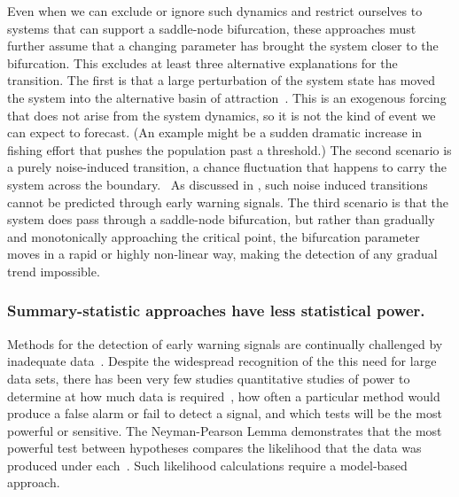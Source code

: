 \documentclass[authoryear,review,11pt]{elsarticle}
\begin{document}
Even when we can exclude or ignore such dynamics and 
restrict ourselves to systems that can support a saddle-node bifurcation,
these approaches must further assume that a changing parameter 
has brought the system closer to the bifurcation.  
This excludes at least three alternative explanations for the transition.  
The first is that a large perturbation of the system state 
has moved the system into the alternative basin of attraction~\citep{Scheffer2001, Scheffer2001}.  
This is an exogenous forcing that does not arise from the system dynamics, so it is not the kind of event we can expect to forecast. 
(An example might be a sudden dramatic increase in fishing effort that pushes the population past a threshold.)
The second scenario is a purely noise-induced transition, a chance fluctuation that happens to carry the system across the boundary.~\citep{Ditlevsen2010}  
As discussed in \citet{Livina2012}, such noise induced transitions cannot be predicted through early warning signals.  
The third scenario is that the system does pass through a saddle-node bifurcation, 
but rather than gradually and monotonically approaching the critical point, the 
bifurcation parameter moves in a rapid or highly non-linear way, making the detection of any gradual trend impossible.  





\subsubsection*{Summary-statistic approaches have less statistical power.}
Methods for the detection of early warning signals are continually challenged by inadequate data~\citep{Inman2011, Scheffer2010,Held2004, Dakos2008, Scheffer2009, Guttal2008, Carpenter2011, Bestelmeyer2011}. 
Despite the widespread recognition of the this need for large data sets, 
there has been very few studies quantitative studies of power to determine at how much data is required~\citep{Contamin2009},
how often a particular method would produce a false alarm or fail to detect a signal,
and which tests will be the most powerful or sensitive.  
The Neyman-Pearson Lemma demonstrates that the most powerful test between hypotheses 
compares the likelihood that the data was produced under each~\citep{Neyman1933}. 
Such likelihood calculations require a model-based approach. 
\end{document}
